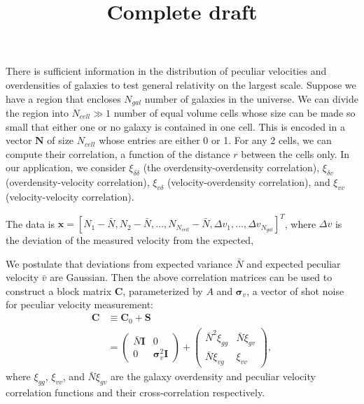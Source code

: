 \documentclass{article}
\title{Complete draft}
\begin{document}
\maketitle


There is sufficient information in the distribution of peculiar velocities and overdensities of galaxies to test general relativity on the largest scale. Suppose we have a region that encloses $N_{gal}$ number of galaxies in the universe. We can divide the region into $N_{cell}\gg 1$ number of equal volume cells whose size can be made so small that either one or no galaxy is contained in one cell. This is encoded in a vector $\textbf{N}$ of size $N_{cell}$ whose entries are either 0 or 1. For any 2 cells, we can compute their correlation, a function of the distance $r$ between the cells only. In our application, we consider $\xi_{\delta\delta}$ (the overdensity-overdensity correlation), $\xi_{\delta v}$ (overdensity-velocity correlation), $\xi_{v\delta}$ (velocity-overdensity correlation), and $\xi_{vv}$ (velocity-velocity correlation).\par

The data  is $\textbf{x}= [N_1-\bar{N}, N_2-\bar{N}, \hdots, N_{N_{cell}}-\bar{N}, \Delta v_1, \hdots, \Delta v_{N_{gal}}]^T$, where $\Delta v$ is the deviation of the measured velocity from the expected, 

We postulate that deviations from expected variance $\bar{N}$ and expected peculiar velocity $\bar{v}$ are Gaussian. Then the above correlation matrices can be used to construct a block matrix $\textbf{C}$, parameterized by $A$ and $\bm{\sigma}_v$, a vector of shot noise for peculiar velocity measurement:
\begin{align}
\textbf{C} &\equiv \textbf{C}_0 + \textbf{S}\\
&=
\left(
\begin{array}{cc}
\bar{N}\textbf{I} & 0 \nonumber \\
0 & \bm{\sigma}_v^2\textbf{I}
\end{array}
\right)
+
\begin{pmatrix}
\bar{N}^2\xi_{gg} & \bar{N}\xi_{g v} \\
\bar{N}\xi_{v g} & \xi_{vv}
\end{pmatrix},
\end{align}
where $\xi_{gg}$, $\xi_{vv}$, and $\bar{N}\xi_{g v}$ are the galaxy overdensity and peculiar velocity correlation functions and their cross-correlation
respectively.  
\end{document}
